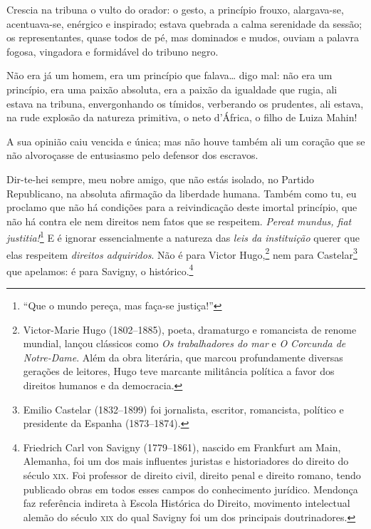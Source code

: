 Crescia na tribuna o vulto do orador: o gesto, a princípio frouxo,
alargava-se, acentuava-se, enérgico e inspirado; estava quebrada a calma
serenidade da sessão; os representantes, quase todos de pé, mas
dominados e mudos, ouviam a palavra fogosa, vingadora e formidável do
tribuno negro.

Não era já um homem, era um princípio que falava\ldots{} digo mal: não era um
princípio, era uma paixão absoluta, era a paixão da igualdade que rugia,
ali estava na tribuna, envergonhando os tímidos, verberando os
prudentes, ali estava, na rude explosão da natureza primitiva, o neto
d'África, o filho de Luiza Mahin!

A sua opinião caiu vencida e única; mas não houve também ali um coração
que se não alvoroçasse de entusiasmo pelo defensor dos escravos.

Dir-te-hei sempre, meu nobre amigo, que não estás isolado, no Partido
Republicano, na absoluta afirmação da liberdade humana. Também como tu,
eu proclamo que não há condições para a reivindicação deste imortal
princípio, que não há contra ele nem direitos nem fatos que se
respeitem. \emph{Pereat mundus, fiat justitia!}\footnote{``Que o mundo
  pereça, mas faça-se justiça!''} E é ignorar essencialmente a natureza
das \emph{leis da instituição} querer que elas respeitem \emph{direitos
adquiridos}. Não é para Victor Hugo,\footnote{Victor-Marie Hugo
  (1802--1885), poeta, dramaturgo e romancista de renome mundial, lançou
  clássicos como \emph{Os trabalhadores do mar} e \emph{O Corcunda de Notre-Dame}.
  Além da obra literária, que marcou profundamente diversas gerações de
  leitores, Hugo teve marcante militância política a favor dos direitos
  humanos e da democracia.} nem para Castelar\footnote{Emilio
  Castelar (1832--1899) foi jornalista, escritor, romancista, político e
  presidente da Espanha (1873--1874).} que apelamos: é para Savigny, o
histórico.\footnote{Friedrich Carl von Savigny (1779--1861), nascido em
  Frankfurt am Main, Alemanha, foi um dos mais influentes juristas e
  historiadores do direito do século \textsc{xix}. Foi professor de direito
  civil, direito penal e direito romano, tendo publicado obras em todos
  esses campos do conhecimento jurídico. Mendonça faz referência
  indireta à Escola Histórica do Direito, movimento intelectual alemão
  do século \textsc{xix} do qual Savigny foi um dos principais doutrinadores.}

